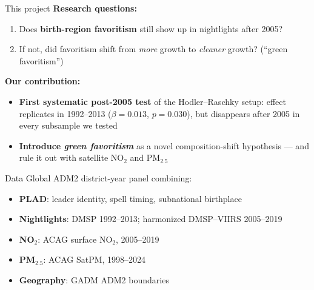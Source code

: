 \documentclass[aspectratio=169, 11pt]{beamer}
\begin{document}
\begin{frame}{This project}
    \textbf{Research questions:}
    \begin{enumerate}
        \item Does \textbf{birth-region favoritism} still show up in nightlights after 2005?
        \item If not, did favoritism shift from \emph{more} growth to \emph{cleaner} growth? (``green favoritism'')
    \end{enumerate}

    \vspace{0.6em}
    \textbf{Our contribution:}
    \begin{itemize}
        \item \textbf{First systematic post-2005 test} of the Hodler--Raschky setup: effect replicates in 1992--2013 ($\beta = 0.013$, $p = 0.030$), but disappears after 2005 in every subsample we tested
        \item \textbf{Introduce \emph{green favoritism}} as a novel composition-shift hypothesis --- and rule it out with satellite NO$_2$ and PM$_{2.5}$
    \end{itemize}
\end{frame}

\begin{frame}{Data}
    Global ADM2 district-year panel combining:
    \begin{itemize}
        \item \textbf{PLAD}: leader identity, spell timing, subnational birthplace
        \item \textbf{Nightlights}: DMSP 1992--2013; harmonized DMSP--VIIRS 2005--2019
        \item \textbf{NO$_2$}: ACAG surface NO$_2$, 2005--2019
        \item \textbf{PM$_{2.5}$}: ACAG SatPM, 1998--2024
        \item \textbf{Geography}: GADM ADM2 boundaries
    \end{itemize}

\end{frame}
\end{document}
